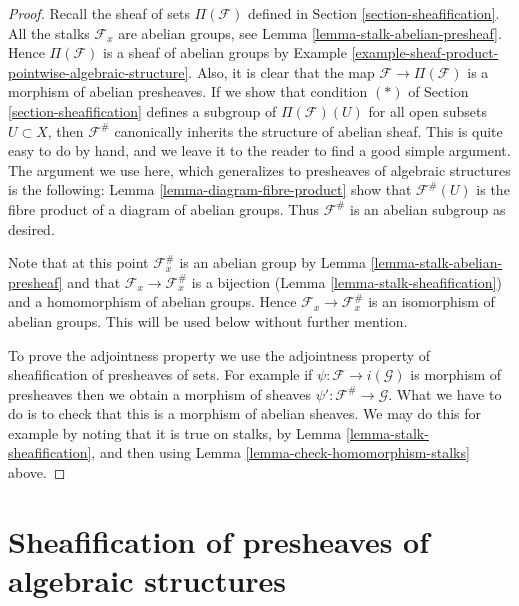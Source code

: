 \begin{proof}
Recall the sheaf of sets $\Pi(\mathcal{F})$ defined in
Section \ref{section-sheafification}. All the stalks
$\mathcal{F}_x$ are abelian groups, see
Lemma \ref{lemma-stalk-abelian-presheaf}.
Hence $\Pi(\mathcal{F})$ is a sheaf of abelian groups by
Example \ref{example-sheaf-product-pointwise-algebraic-structure}.
Also, it is clear that the map $\mathcal{F} \to \Pi(\mathcal{F})$
is a morphism of abelian presheaves. If we show that
condition $(*)$ of Section \ref{section-sheafification} defines a subgroup
of $\Pi(\mathcal{F})(U)$ for all open subsets $U \subset X$,
then $\mathcal{F}^\#$ canonically inherits the structure of abelian sheaf.
This is quite easy to do by hand, and we leave it to the
reader to find a good simple argument. The argument we use here,
which generalizes to presheaves of algebraic structures is the following:
Lemma \ref{lemma-diagram-fibre-product} show that
$\mathcal{F}^\#(U)$ is the fibre product of a diagram
of abelian groups. Thus $\mathcal{F}^\#$ is an abelian
subgroup as desired.

\medskip\noindent
Note that at this point $\mathcal{F}^\#_x$ is an abelian
group by Lemma \ref{lemma-stalk-abelian-presheaf}
and that $\mathcal{F}_x \to \mathcal{F}^\#_x$ is a
bijection (Lemma \ref{lemma-stalk-sheafification})
and a homomorphism of abelian groups. Hence
$\mathcal{F}_x \to \mathcal{F}^\#_x$ is an isomorphism
of abelian groups. This will be used below without further mention.

\medskip\noindent
To prove the adjointness property we use the adjointness
property of sheafification of presheaves of sets. For example
if $\psi : \mathcal{F} \to i(\mathcal{G})$ is morphism of presheaves
then we obtain a morphism of sheaves
$\psi' : \mathcal{F}^\# \to \mathcal{G}$. What we have to do is to check
that this is a morphism of abelian sheaves. We may do this
for example by noting that it is true on stalks,
by Lemma \ref{lemma-stalk-sheafification}, and then using
Lemma \ref{lemma-check-homomorphism-stalks} above.
\end{proof}



\section{Sheafification of presheaves of algebraic structures}
\label{section-sheafification-presheaves-structures}


